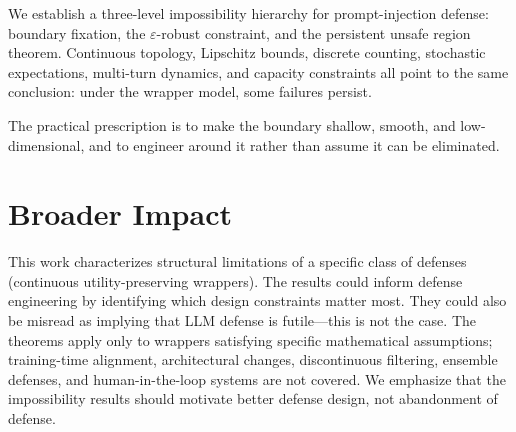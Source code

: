\documentclass{article}
\begin{document}
We establish a three-level impossibility hierarchy for prompt-injection
defense: boundary fixation, the $\varepsilon$-robust constraint, and the
persistent unsafe region theorem. Continuous topology, Lipschitz bounds,
discrete counting, stochastic expectations, multi-turn dynamics, and
capacity constraints all point to the same conclusion: under the
wrapper model, some failures persist. 

The practical prescription is to make the boundary shallow, smooth,
and low-dimensional, and to engineer around it rather than assume it
can be eliminated.

\section*{Broader Impact}
This work characterizes structural limitations of a specific class
of defenses (continuous utility-preserving wrappers). The results
could inform defense engineering by identifying which design
constraints matter most. They could also be misread as implying
that LLM defense is futile---this is not the case. The theorems
apply only to wrappers satisfying specific mathematical assumptions;
training-time alignment, architectural changes, discontinuous
filtering, ensemble defenses, and human-in-the-loop systems are
not covered. We emphasize that the impossibility results should
motivate better defense design, not abandonment of defense.
\end{document}
